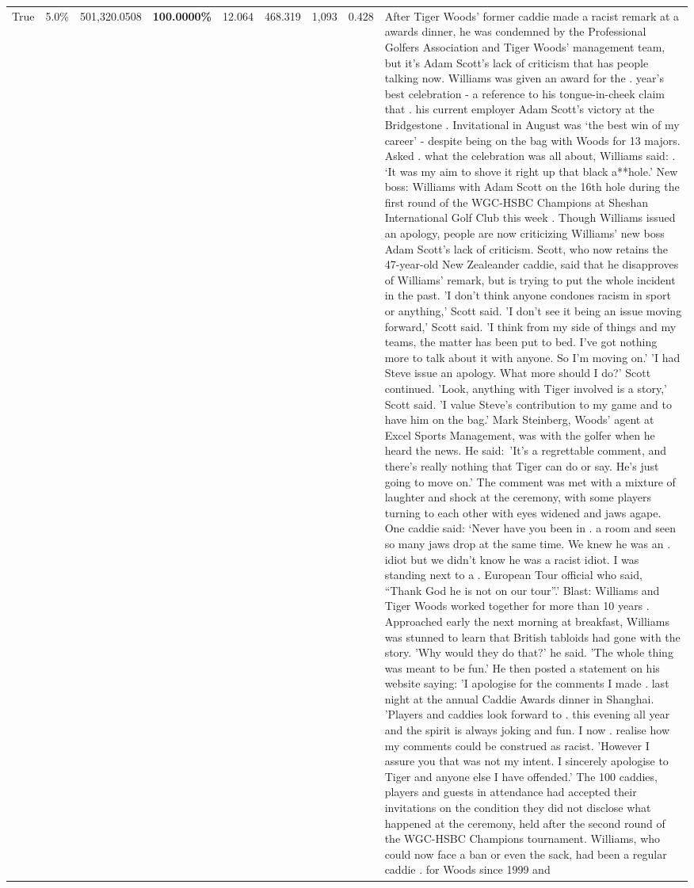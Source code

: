 \begin{table}[H]
\begin{tabular}{lllrlllll}
True & 5.0\% & 501,320.0508 & \bfseries \color{red} 100.0000\% & 12.064 & 468.319 & 1,093 & 0.428 & After Tiger Woods' former caddie made a racist remark at a awards dinner, he was condemned by the Professional Golfers Association and Tiger Woods' management team, but it's Adam Scott's lack of criticism that has people talking now. Williams was given an award for the . year’s best celebration - a reference to his tongue-in-cheek claim that . his current employer Adam Scott’s victory at the Bridgestone . Invitational in August was ‘the best win of my career’ - despite being on the bag with Woods for 13 majors. Asked . what the celebration was all about, Williams said: . ‘It was my aim to shove it right up that black a**hole.’ New boss: Williams with Adam Scott  on the 16th hole during the first round of the WGC-HSBC Champions at Sheshan International Golf Club this week . Though Williams issued an apology, people are now criticizing Williams' new boss Adam Scott's lack of criticism. Scott, who now retains the 47-year-old New Zealeander caddie, said that he disapproves of Williams' remark, but is trying to put the whole incident in the past. 'I don't think anyone condones racism in sport or anything,' Scott said. 'I don't see it being an issue moving forward,' Scott said. 'I think from my side of things and my teams, the matter has been put to bed. I've got nothing more to talk about it with anyone. So I'm moving on.' 'I had Steve issue an apology. What more should I do?' Scott continued. 'Look, anything with Tiger involved is a story,' Scott said. 'I value Steve's contribution to my game and to have him on the bag.' Mark Steinberg, Woods' agent at Excel Sports Management, was with the golfer when he heard the news. He said: 'It's a regrettable comment, and there's really nothing that Tiger can do or say. He's just going to move on.' The comment was met with a mixture of laughter and shock at the ceremony, with some players turning to each other with eyes widened and jaws agape. One caddie said: ‘Never have you been in . a room and seen so many jaws drop at the same time. We knew he was an . idiot but we didn’t know he was a racist idiot. I was standing next to a . European Tour official who said, “Thank God he is not on our tour”.’ Blast: Williams and Tiger Woods worked together for more than 10 years . Approached early the next morning at breakfast, Williams was stunned to learn that British tabloids had gone with the story. 'Why would they do that?' he said. 'The whole thing was meant to be fun.' He then posted a statement on his website saying: 'I apologise for the comments I made . last night at the annual Caddie Awards dinner in Shanghai. 'Players and caddies look forward to . this evening all year and the spirit is always joking and fun. I now . realise how my comments could be construed as racist. 'However I assure you that was not my intent. I sincerely apologise to Tiger and anyone else I have offended.' The 100 caddies, players and guests in attendance had accepted their invitations on the condition they did not disclose what happened at the ceremony, held after the second round of the WGC-HSBC Champions tournament. Williams, who could now face a ban or even the sack, had been a regular caddie . for Woods since 1999 and 
\end{tabular}
\end{table}
